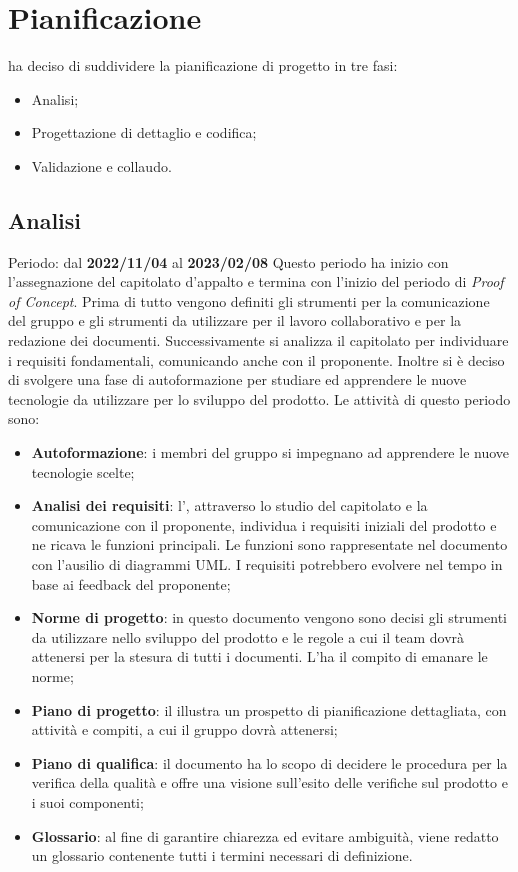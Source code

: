 \section{Pianificazione}
\groupName\:ha deciso di suddividere la pianificazione di progetto in tre fasi:
\begin{itemize}
    \item Analisi;
    \item Progettazione di dettaglio e codifica;
    \item Validazione e collaudo.
\end{itemize}

\subsection{Analisi}
Periodo: dal \textbf{2022/11/04} al \textbf{2023/02/08} \newline
Questo periodo ha inizio con l'assegnazione del capitolato d'appalto e termina con l'inizio del periodo di \textit{Proof of Concept}\glo.
Prima di tutto vengono definiti gli strumenti per la comunicazione del gruppo e gli strumenti da utilizzare per il lavoro collaborativo e
per la redazione dei documenti. Successivamente si analizza il capitolato per individuare i requisiti fondamentali, comunicando anche con
il proponente.
Inoltre si è deciso di svolgere una fase di autoformazione per studiare ed apprendere le nuove tecnologie da utilizzare per lo sviluppo del prodotto.
Le attività di questo periodo sono:
\begin{itemize}
    \item \textbf{Autoformazione}: i membri del gruppo si impegnano ad apprendere le nuove tecnologie scelte;
    \item \textbf{Analisi dei requisiti}: l'\roleAnalyst, attraverso lo studio del capitolato e la comunicazione con il proponente,
          individua i requisiti iniziali del prodotto e ne ricava le funzioni principali. Le funzioni sono rappresentate nel documento
          con l'ausilio di diagrammi UML\glo . I requisiti potrebbero evolvere nel tempo in base ai feedback del proponente;
    \item \textbf{Norme di progetto}: in questo documento vengono sono decisi gli strumenti da utilizzare nello sviluppo del prodotto
          e le regole a cui il team dovrà attenersi per la stesura di tutti i documenti. L'\roleAdministrator\:ha il compito di emanare
          le norme;
    \item \textbf{Piano di progetto}: il \roleProjectManager\:illustra un prospetto di pianificazione dettagliata, con attività e compiti,
          a cui il gruppo dovrà attenersi;
    \item \textbf{Piano di qualifica}: il documento ha lo scopo di decidere le procedura per la verifica della qualità e
          offre una visione sull'esito delle verifiche sul prodotto e i suoi componenti;
    \item \textbf{Glossario}: al fine di garantire chiarezza ed evitare ambiguità, viene redatto un glossario contenente tutti i termini necessari di definizione.
\end{itemize}
